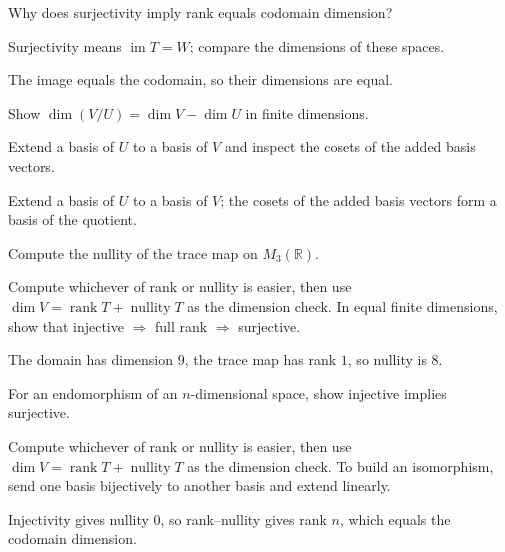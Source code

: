 \begin{exercise}\label{exr:i06-04}
Why does surjectivity imply rank equals codomain dimension?
\end{exercise}
\begin{hint}
Surjectivity means \(\operatorname{im}T=W\); compare the dimensions of these spaces.
\end{hint}
\begin{solution}
The image equals the codomain, so their dimensions are equal.
\end{solution}

\begin{exercise}\label{exr:i06-05}
Show $\dim(V/U)=\dim V-\dim U$ in finite dimensions.
\end{exercise}
\begin{hint}
Extend a basis of \(U\) to a basis of \(V\) and inspect the cosets of the added basis vectors.
\end{hint}
\begin{solution}
Extend a basis of $U$ to a basis of $V$; the cosets of the added basis vectors form a basis of the quotient.
\end{solution}

\begin{exercise}\label{exr:i06-06}
Compute the nullity of the trace map on $M_3(\mathbb R)$.
\end{exercise}
\begin{hint}
Compute whichever of rank or nullity is easier, then use \(\dim V=\operatorname{rank}T+\operatorname{nullity}T\) as the dimension check. In equal finite dimensions, show that injective \(\Rightarrow\) full rank \(\Rightarrow\) surjective.
\end{hint}
\begin{solution}
The domain has dimension $9$, the trace map has rank $1$, so nullity is $8$.
\end{solution}

\begin{exercise}\label{exr:i06-07}
For an endomorphism of an $n$-dimensional space, show injective implies surjective.
\end{exercise}
\begin{hint}
Compute whichever of rank or nullity is easier, then use \(\dim V=\operatorname{rank}T+\operatorname{nullity}T\) as the dimension check. To build an isomorphism, send one basis bijectively to another basis and extend linearly.
\end{hint}
\begin{solution}
Injectivity gives nullity $0$, so rank–nullity gives rank $n$, which equals the codomain dimension.
\end{solution}


